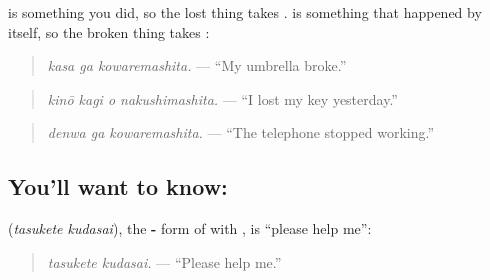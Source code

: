 \textbf{} is something you did, so the lost thing takes \textbf{}. \textbf{} is something that happened by itself, so the broken thing takes \textbf{}:

\begin{quote}
\textbf{ }
\end{quote}

\begin{quote}
\emph{kasa ga kowaremashita.} — \textquotedblleft{}My umbrella broke.\textquotedblright{}
\end{quote}

\begin{quote}
\textbf{  }
\end{quote}

\begin{quote}
\emph{kinō kagi o nakushimashita.} — \textquotedblleft{}I lost my key yesterday.\textquotedblright{}
\end{quote}

\begin{quote}
\textbf{ }
\end{quote}

\begin{quote}
\emph{denwa ga kowaremashita.} — \textquotedblleft{}The telephone stopped working.\textquotedblright{}
\end{quote}

\subsection*{You'll want to know:  }
\textbf{ } (\emph{tasukete kudasai}), the \textbf{-} form of \textbf{} with \textbf{}, is \textquotedblleft{}please help me\textquotedblright{}:

\begin{quote}
\textbf{ }
\end{quote}

\begin{quote}
\emph{tasukete kudasai.} — \textquotedblleft{}Please help me.\textquotedblright{}
\end{quote}

\begin{quote}
\textbf{ }
\end{quote}

